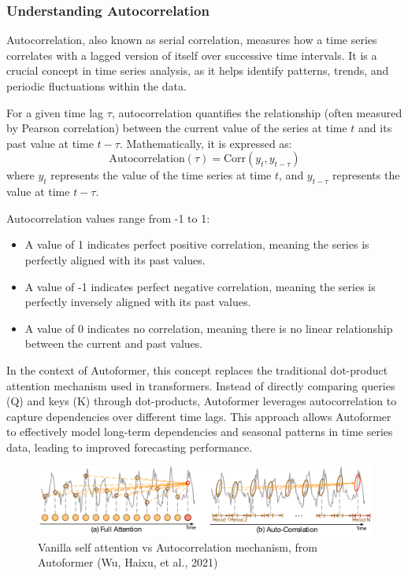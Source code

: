 \subsubsection{Understanding Autocorrelation}
Autocorrelation, also known as serial correlation, measures how a time series correlates with a lagged version of itself over successive time intervals. It is a crucial concept in time series analysis, as it helps identify patterns, trends, and periodic fluctuations within the data.

For a given time lag \( \tau \), autocorrelation quantifies the relationship (often measured by Pearson correlation) between the current value of the series at time \( t \) and its past value at time \( t - \tau \). Mathematically, it is expressed as:
\[
\text{Autocorrelation}(\tau) = \text{Corr}(y_t, y_{t-\tau})
\]
where \( y_t \) represents the value of the time series at time \( t \), and \( y_{t-\tau} \) represents the value at time \( t - \tau \).

Autocorrelation values range from -1 to 1:
\begin{itemize}
    \item A value of 1 indicates perfect positive correlation, meaning the series is perfectly aligned with its past values.
    \item A value of -1 indicates perfect negative correlation, meaning the series is perfectly inversely aligned with its past values.
    \item A value of 0 indicates no correlation, meaning there is no linear relationship between the current and past values.
\end{itemize}

In the context of Autoformer, this concept replaces the traditional dot-product attention mechanism used in transformers. Instead of directly comparing queries (Q) and keys (K) through dot-products, Autoformer leverages autocorrelation to capture dependencies over different time lags. This approach allows Autoformer to effectively model long-term dependencies and seasonal patterns in time series data, leading to improved forecasting performance.

\begin{figure}[htbp]
    \centering
    \includegraphics[width=15cm]{3_ChapterTranformerVariants/figuras/FullAttentionAutoCorrelation.pdf}
    \caption{Vanilla self attention vs Autocorrelation mechanism, from Autoformer (Wu, Haixu, et al., 2021)\cite{wu2022autoformerdecompositiontransformersautocorrelation}}
    \end{figure}


